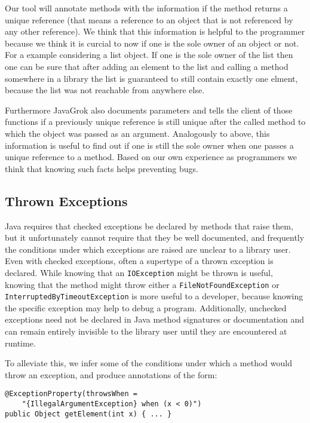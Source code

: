 Our tool will annotate methods with the information if the method returns a 
unique reference (that means a reference to an object that is not referenced 
by any other reference). We think that this information is helpful to the 
programmer because we think it is curcial to now if one is the sole owner of 
an object or not. For a example considering a list object. If one is the sole
owner of the list then one can be sure that after adding an element to the list
and calling a method somewhere in a library the list is guaranteed to still 
contain exactly one elment, because the list was not reachable from anywhere
else.

Furthermore JavaGrok also documents parameters and tells the client
of those functions if a previously unique reference is still unique after the 
called method to which the object was passed as an argument. Analogously to 
above, this information is useful to find out if one is still the sole owner
when one passes a unique reference to a method. Based on our own experience
as programmers we think that knowing such facts helps preventing bugs.

\subsection{Thrown Exceptions}

Java requires that checked exceptions be declared by methods that raise them,
but it unfortunately cannot require that they be well documented, and
frequently the conditions under which exceptions are raised are unclear to a
library user. Even with checked exceptions, often a supertype of a thrown
exception is declared.  While knowing that an \texttt{IOException} might be
thrown is useful, knowing that the method might throw either a
\texttt{FileNotFoundException} or \texttt{InterruptedByTimeoutException} is more
useful to a developer, because knowing the specific exception may help to debug
a program.  Additionally, unchecked exceptions need not be declared in Java method
signatures or documentation and can remain entirely invisible to the library
user until they are encountered at runtime.

To alleviate this, we infer some of the conditions under which a method would
throw an exception, and produce annotations of the form:

\begin{verbatim}
@ExceptionProperty(throwsWhen =
    "{IllegalArgumentException} when (x < 0)")
public Object getElement(int x) { ... }
\end{verbatim}

